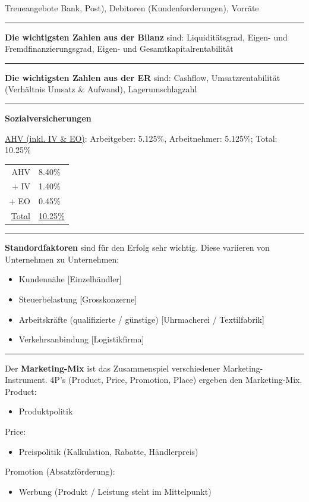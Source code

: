 \documentclass{article} %
\begin{document}
\begin{minipage}[t][0.8\textheight]{0.97\textwidth}
\begin{multicols*}{4}
\begin{flushleft}
{			Treueangebote Bank, Post), Debitoren (Kundenforderungen), Vorräte
			\noindent\rule{\linewidth}{0.4pt}
			\textbf{Die wichtigsten Zahlen aus der Bilanz} sind: Liquiditätsgrad, 
			Eigen- und Fremdfinanzierungsgrad, Eigen- und Gesamtkapitalrentabilität
			\noindent\rule{\linewidth}{0.4pt}
			\textbf{Die wichtigsten Zahlen aus der ER} sind:
			Cashflow, Umsatzrentabilität (Verhältnis Umsatz
			\& Aufwand), Lagerumschlagzahl
			\noindent\rule{\linewidth}{0.4pt}
			\textbf{Sozialversicherungen}\par\noindent
			\underline{AHV (inkl. IV \& EO)}: Arbeitgeber: 5.125\%, 
			Arbeitnehmer: 5.125\%; Total: 10.25\%
			\par\noindent
			\par\noindent
			\begin{tabular}{r l}
				AHV & 8.40\% \\
				+ IV & 1.40\% \\
				+ EO & 0.45\% \\
				\hline
				\underline{Total} & \underline{10.25\%}
			\end{tabular}
			\noindent\rule{\linewidth}{0.4pt}
			\textbf{Standordfaktoren} sind für den Erfolg sehr
			wichtig. Diese variieren von Unternehmen zu
			Unternehmen:
			\begin{itemize}
				\item Kundennähe [Einzelhändler]
				\item Steuerbelastung [Grosskonzerne]
				\item Arbeitskräfte (qualifizierte / günstige)
				[Uhrmacherei / Textilfabrik]
				\item Verkehrsanbindung [Logistikfirma]
			\end{itemize}
			\noindent\rule{\linewidth}{0.4pt}
			Der \textbf{Marketing-Mix} ist das Zusammenspiel verschiedener 
			Marketing-Instrument. 4P’s (Product, Price, Promotion, Place) 
			ergeben den Marketing-Mix.\newline
			Product:
			\begin{itemize}
				\item Produktpolitik
			\end{itemize}
			Price:
			\begin{itemize}
				\item Preispolitik (Kalkulation, Rabatte, Händlerpreis)
			\end{itemize}
			Promotion (Absatzförderung):
			\begin{itemize}
				\item Werbung (Produkt / Leistung steht im Mittelpunkt)

\end{itemize}}
\end{flushleft}
\end{multicols*}
\end{minipage}
\end{document}
